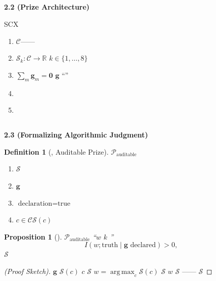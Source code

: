 \documentclass[12pt,a4paper]{article}
\newtheorem{proposition}[theorem]{Proposition}
\newtheorem{definition}[theorem]{Definition}
\theoremstyle{remark}
\newcommand{\R}{\mathbb{R}}
\newcommand{\gaugeVec}{\mathbf{g}}
\newcommand{\sumgd}{\sum_m \mathbf{g}_m = \mathbf{0}}
\newcommand{\scoreOp}{\mathcal{S}}
\newcommand{\prizeSet}{\mathcal{P}}
\newcommand{\candidateSet}{\mathcal{C}}
\DeclareMathOperator{\argmax}{arg\,max}
\begin{document}
\subsection{}

\noindent
\textbf{2.2  (Prize Architecture)}

SCX

\begin{enumerate}[label=\textbf{P\arabic*}.]
    \item \textbf{} $\candidateSet$——
    
    \item \textbf{} $\scoreOp_k: \candidateSet \to \R$ $k \in \{1, \dots, 8\}$
    
    \item \textbf{} $\sumgd$ $\gaugeVec$ ``''
    
    \item \textbf{}
    
    \item \textbf{}
\end{enumerate}

\subsection{}

\noindent
\textbf{2.3  (Formalizing Algorithmic Judgment)}

\begin{definition}[, Auditable Prize]
\label{def:auditable_prize}
\textbf{} $\prizeSet_{\text{auditable}}$ 
\begin{enumerate}[label=(\roman*)]
    \item $\scoreOp$ 
    \item $\gaugeVec$ 
    \item $\text{declaration} = \text{true}$
    \item  $c \in \candidateSet$$\scoreOp(c)$ 
\end{enumerate}
\end{definition}

\begin{proposition}[]
\label{prop:auditable_info}
 $\prizeSet_{\text{auditable}}$ ``$w$  $k$ ''
\begin{equation}
    I(w; \text{truth} \mid \gaugeVec \text{ declared}) > 0,
    \label{eq:info_positive}
\end{equation}
 $\scoreOp$ 
\end{proposition}

\begin{proof}[ (Proof Sketch)]
 $\gaugeVec$  $\scoreOp(c)$  $c$  $\scoreOp$ $w = \argmax_c \scoreOp(c)$  $\scoreOp$ $w$  $\scoreOp$ —— $\scoreOp$ 
\end{proof}
\end{document}
